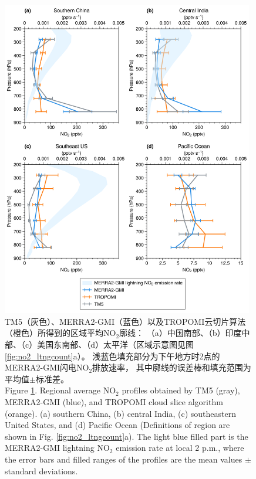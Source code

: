 \begin{figure}[H]
    \centering
    \includegraphics[width=11cm]{./figures/utno2_profile.png}
    \caption{
    TM5（灰色）、MERRA2-GMI（蓝色）以及TROPOMI云切片算法（橙色）所得到的区域平均NO$_2$廓线：
    （a）中国南部、（b）印度中部、（c）美国东南部、（d）太平洋（区域示意图见图\ref{fig:no2_ltngcount}a）。
    浅蓝色填充部分为下午地方时2点的MERRA2-GMI闪电NO$_2$排放速率，
    其中廓线的误差棒和填充范围为平均值$\pm$标准差。\\
    Figure \ref{fig:utno2_profile}. Regional average NO$_2$ profiles obtained by TM5 (gray), MERRA2-GMI (blue), and TROPOMI cloud slice algorithm (orange).
    (a) southern China, (b) central India, (c) southeastern United States, and (d) Pacific Ocean
    (Definitions of region are shown in Fig. \ref{fig:no2_ltngcount}a).
    The light blue filled part is the MERRA2-GMI lightning NO$_2$ emission rate at local 2 p.m.,
    where the error bars and filled ranges of the profiles are the mean values $\pm$ standard deviations.
    }
    \label{fig:utno2_profile}
\end{figure}
\FloatBarrier


